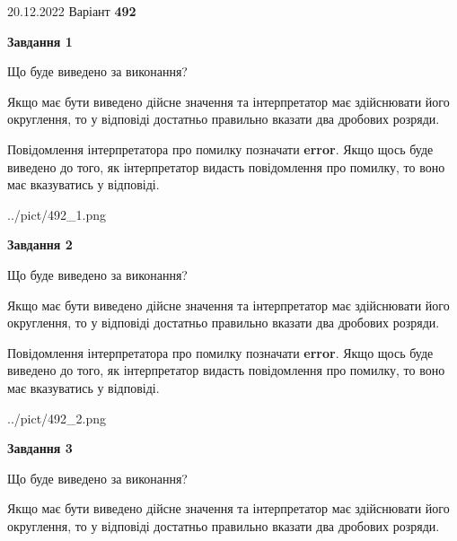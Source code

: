 \documentclass[12pt, ukrainian]{article}
\begin{document}
{20.12.2022 Варіант \No \textbf { 492 }\par}
{
\begin {Large}

{\begin {center}\textbf{Завдання 1}\end {center}}\par
Що буде виведено за виконання? \par

Якщо має бути виведено дійсне значення та інтерпретатор має здійснювати його округлення, 
то у відповіді достатньо правильно вказати два дробових розряди.

Повідомлення інтерпретатора про помилку позначати \textbf{error}.
Якщо щось буде виведено до того, як інтерпретатор видасть повідомлення про помилку, 
то воно має вказуватись у відповіді. \par

\begin{center}
	{../pict/492_1.png}
\end{center}
\newpage

{\begin {center}\textbf{Завдання 2}\end {center}}\par
Що буде виведено за виконання? \par

Якщо має бути виведено дійсне значення та інтерпретатор має здійснювати його округлення, 
то у відповіді достатньо правильно вказати два дробових розряди.

Повідомлення інтерпретатора про помилку позначати \textbf{error}.
Якщо щось буде виведено до того, як інтерпретатор видасть повідомлення про помилку, 
то воно має вказуватись у відповіді. \par

\begin{center}
	{../pict/492_2.png}
\end{center}
\newpage

{\begin {center}\textbf{Завдання 3}\end {center}}\par
Що буде виведено за виконання? \par

Якщо має бути виведено дійсне значення та інтерпретатор має здійснювати його округлення, 
то у відповіді достатньо правильно вказати два дробових розряди.


\end{Large}}
\end{document}
